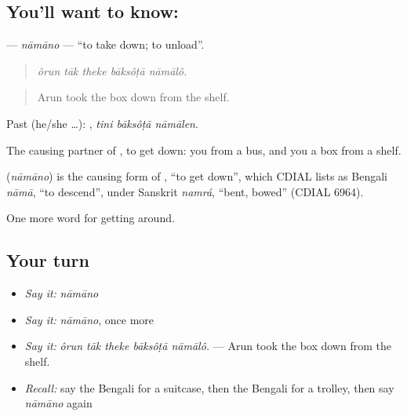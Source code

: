 \subsection*{You'll want to know: }
\textbf{} — \emph{nāmāno} — \textquotedblleft{}to take down; to unload\textquotedblright{}.

\begin{quote}
    
\end{quote}

\begin{quote}
\emph{ôrun tāk theke bāksôṭā nāmālô.}
\end{quote}

\begin{quote}
Arun took the box down from the shelf.
\end{quote}

Past (he/she …):   , \emph{tini bāksôṭā nāmālen}.

The causing partner of , to get down: you  from a bus, and you  a box from a shelf.

\begin{cousinweb}
\textbf{} (\emph{nāmāno}) is the causing form of \textbf{}, \textquotedblleft{}to get down\textquotedblright{}, which CDIAL lists as Bengali \emph{nāmā}, \textquotedblleft{}to descend\textquotedblright{}, under Sanskrit \emph{namrá}, \textquotedblleft{}bent, bowed\textquotedblright{} (CDIAL 6964).
\end{cousinweb}

\begin{grammarlens}[title={What you've built}]
One more word for getting around.
\end{grammarlens}

\subsection*{Your turn}
\begin{itemize}
\raggedright
  \item \emph{Say it:} \emph{nāmāno}
  \item \emph{Say it:} \emph{nāmāno}, once more
  \item \emph{Say it:} \emph{ôrun tāk theke bāksôṭā nāmālô.} — Arun took the box down from the shelf.
  \item \emph{Recall:} say the Bengali for a suitcase, then the Bengali for a trolley, then say \emph{nāmāno} again
\end{itemize}

